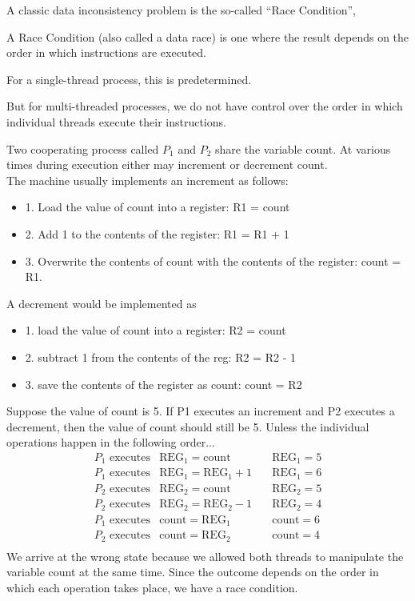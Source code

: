 \documentclass[a4paper, 10pt]{article}
\begin{document}
A classic data inconsistency problem is the so-called “Race Condition”,


A Race Condition (also called a data race) is one where the result depends on the order in which instructions are executed.

For a single-thread process, this is predetermined.

But for multi-threaded processes, we do not have control over the order in which individual threads execute their instructions.

\begin{examplebox}{}{}
    Two cooperating process called $P_1$ and $P_2$ share the variable count. At various times during execution either may increment or decrement count. \\[2ex]

    The machine usually implements an increment as follows:
    \begin{itemize}
        \item 1. Load the value of count into a register: R1 = count
        \item 2. Add 1 to the contents of the register: R1 = R1 + 1
        \item 3. Overwrite the contents of count with the contents of the register: count = R1.
    \end{itemize}
    A decrement would be implemented as
    \begin{itemize}
        \item  1. load the value of count into a register: R2 = count
        \item  2. subtract 1 from the contents of the reg: R2 = R2 - 1
        \item 3. save the contents of the register as count: count = R2
    \end{itemize}
    Suppose the value of count is 5. If P1 executes an increment and P2 executes a decrement, then the value of count should still be 5. Unless the individual operations happen in the following order...
    $$
        \begin{array}{rlrl}
            P_1 \text{ executes} & \text{REG}_1 = \text{count}     & \quad \text{REG}_1 = 5 \\
            P_1 \text{ executes} & \text{REG}_1 = \text{REG}_1 + 1 & \quad \text{REG}_1 = 6 \\
            P_2 \text{ executes} & \text{REG}_2 = \text{count}     & \quad \text{REG}_2 = 5 \\
            P_2 \text{ executes} & \text{REG}_2 = \text{REG}_2 - 1 & \quad \text{REG}_2 = 4 \\
            P_1 \text{ executes} & \text{count} = \text{REG}_1     & \quad \text{count} = 6 \\
            P_2 \text{ executes} & \text{count} = \text{REG}_2     & \quad \text{count} = 4 \\
        \end{array}
    $$
    We arrive at the wrong state because we allowed both threads to manipulate the variable count at the same time. Since the outcome depends on the order in which each operation takes place, we have a race condition.
\end{examplebox}
\end{document}
